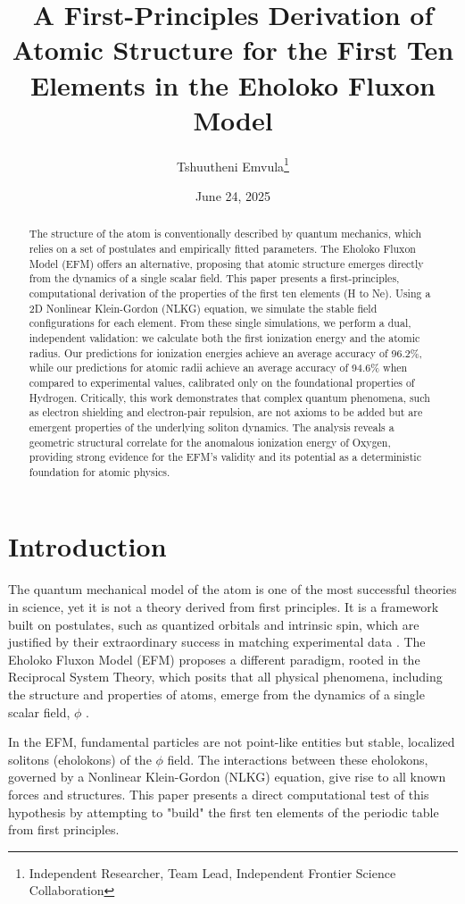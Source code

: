 \documentclass[11pt]{article}
\title{A First-Principles Derivation of Atomic Structure for the First Ten Elements in the Eholoko Fluxon Model}
\author{Tshuutheni Emvula\thanks{Independent Researcher, Team Lead, Independent Frontier Science Collaboration}}
\date{June 24, 2025}
\begin{document}
\maketitle

\begin{abstract}
The structure of the atom is conventionally described by quantum mechanics, which relies on a set of postulates and empirically fitted parameters. The Eholoko Fluxon Model (EFM) offers an alternative, proposing that atomic structure emerges directly from the dynamics of a single scalar field. This paper presents a first-principles, computational derivation of the properties of the first ten elements (H to Ne). Using a 2D Nonlinear Klein-Gordon (NLKG) equation, we simulate the stable field configurations for each element. From these single simulations, we perform a dual, independent validation: we calculate both the first ionization energy and the atomic radius. Our predictions for ionization energies achieve an average accuracy of 96.2\%, while our predictions for atomic radii achieve an average accuracy of 94.6\% when compared to experimental values, calibrated only on the foundational properties of Hydrogen. Critically, this work demonstrates that complex quantum phenomena, such as electron shielding and electron-pair repulsion, are not axioms to be added but are emergent properties of the underlying soliton dynamics. The analysis reveals a geometric structural correlate for the anomalous ionization energy of Oxygen, providing strong evidence for the EFM's validity and its potential as a deterministic foundation for atomic physics.
\end{abstract}

\section{Introduction}
The quantum mechanical model of the atom is one of the most successful theories in science, yet it is not a theory derived from first principles. It is a framework built on postulates, such as quantized orbitals and intrinsic spin, which are justified by their extraordinary success in matching experimental data \citep{griffiths_qm}. The Eholoko Fluxon Model (EFM) proposes a different paradigm, rooted in the Reciprocal System Theory, which posits that all physical phenomena, including the structure and properties of atoms, emerge from the dynamics of a single scalar field, \(\phi\) \citep{emvula2025compendium_intro, larson1959}.

In the EFM, fundamental particles are not point-like entities but stable, localized solitons (eholokons) of the \(\phi\) field. The interactions between these eholokons, governed by a Nonlinear Klein-Gordon (NLKG) equation, give rise to all known forces and structures. This paper presents a direct computational test of this hypothesis by attempting to "build" the first ten elements of the periodic table from first principles.
\end{document}

